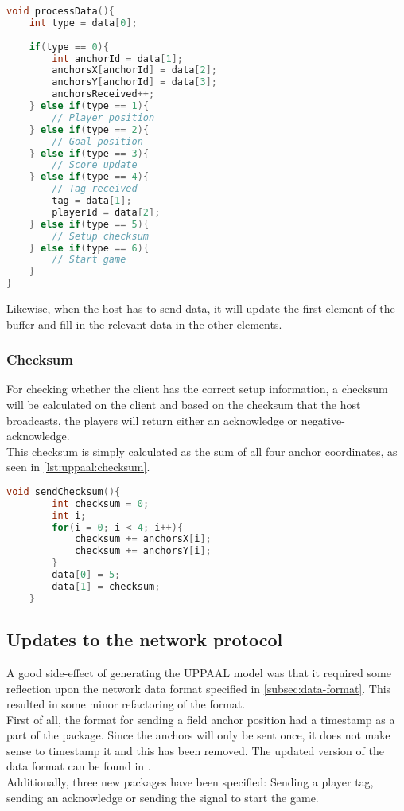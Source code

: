 \begin{lstlisting}[caption={Processing Data in UPPAAL model}, captionpos=b,language=C,label={lst:uppaal:processData}]
void processData(){
    int type = data[0];
    
    if(type == 0){
        int anchorId = data[1];
        anchorsX[anchorId] = data[2];
        anchorsY[anchorId] = data[3];
        anchorsReceived++;
    } else if(type == 1){
        // Player position
    } else if(type == 2){
        // Goal position
    } else if(type == 3){
        // Score update
    } else if(type == 4){
        // Tag received
        tag = data[1];
        playerId = data[2];
    } else if(type == 5){
        // Setup checksum
    } else if(type == 6){
        // Start game
    }
}
\end{lstlisting}
\noindent
Likewise, when the host has to send data, it will update the first element of the buffer and fill in the relevant data in the other elements.

\subsubsection{Checksum}
For checking whether the client has the correct setup information, a checksum will be calculated on the client and based on the checksum that the host broadcasts, the players will return either an acknowledge or negative-acknowledge.
\\
This checksum is simply calculated as the sum of all four anchor coordinates, as seen in \autoref{lst:uppaal:checksum}.

\begin{lstlisting}[caption={Calculating checksum in UPPAAL model}, captionpos=b,language=C,label={lst:uppaal:checksum}]
    void sendChecksum(){
        int checksum = 0;
        int i;
        for(i = 0; i < 4; i++){
            checksum += anchorsX[i];
            checksum += anchorsY[i];
        }
        data[0] = 5;
        data[1] = checksum;
    }
\end{lstlisting}

\subsection{Updates to the network protocol}\label{subsec:sprint3networkupdate}
A good side-effect of generating the UPPAAL model was that it required some reflection upon the network data format specified in \autoref{subsec:data-format}.
This resulted in some minor refactoring of the format.
\\
First of all, the format for sending a field anchor position had a timestamp as a part of the package. 
Since the anchors will only be sent once, it does not make sense to timestamp it and this has been removed.
The updated version of the data format can be found in .
\\
Additionally, three new packages have been specified: Sending a player tag, sending an acknowledge or sending the signal to start the game.


